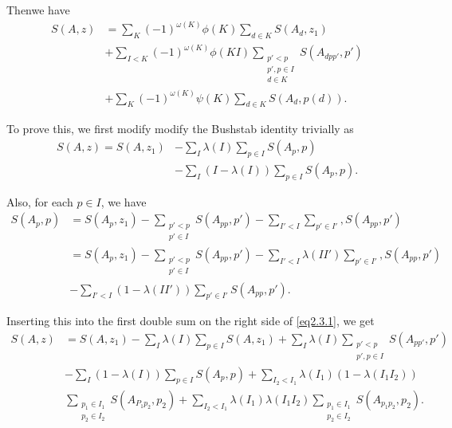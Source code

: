 Then\pageoriginale we have 
\begin{align*}
  S(A,z) & = \sum_K (-1)^{\omega(K)} \phi (K) \sum_{d \in K} S(A_d, z_1) \\
  & + \sum_{I < K} (-1)^{\omega (K)} \phi (KI) \sum_{\substack{ p' <  p
      \\ p', p \in I \\ d \in K}}  S(A_{dpp'}, p') \\  
  & +  \sum_K (-1)^{\omega(K)} \psi (K) \sum_{d \in K} S(A_d, p(d)).
\end{align*}

To prove this, we first modify modify the Bushstab identity trivially as 
\begin{align*}
  S(A,z) = S(A,z_1) & - \sum_I \lambda (I) \sum_{p \in I} S(A_p,  p)
  \\ \tag{2.3.1}
  & - \sum_I (I - \lambda(I)) \sum_{p \in I} S(A_p,  p).  \label{eq2.3.1}
\end{align*}

Also, for each $ p \in I$, we have
\begin{align*}
  S(A_p,  p) & = S(A_p,  z_1)  - \sum_{\substack{ p' <  p \\ p'  \in I
      }} S(A_{pp},p') - \sum_{I' < I} \sum_{p' \in I'}, S(A_{pp},p')\\ 
  &  = S(A_p,  z_1)  - \sum_{\substack{ p' <  p \\ p'  \in I}}
  S(A_{pp},p') - \sum_{I' < I} \lambda (II') \sum_{p' \in I'},
  S(A_{pp},p') \\ 
  & -\sum_{I' < I} (1 - \lambda (II')) \sum_{p' \in I'} S(A_{pp},p'). 
\end{align*}

Inserting this into the first double sum on the right side of
\eqref{eq2.3.1}, we get 
\begin{align*}
  S(A,z) & = S(A, z_1) - \sum_I \lambda(I) \sum_{p \in I}  S(A, z_1) +
  \sum_I \lambda(I) \sum_{\substack{ p' <  p \\ p', p  \in I  }}
  S(A_{pp'}, p') \\ 
  & - \sum_I (1 - \lambda (I)) \sum_{p \in I} S(A_p,  p) + \sum_{I_2 <
    I_1} \lambda(I_1) (1 - \lambda (I_1 I_2)) \\
  & \sum_{\substack{ p_1 \in I_1 \\ p_2 \in   I_2}} S(A_{P_1 p_2}, p_2) 
  + \sum_{I_2 < I_1} \lambda(I_1) \lambda(I_1 I_2) \sum_{\substack{
      p_1 \in   I_1 \\ p_2 \in   I_2}} S(A_{p_1 p_2},p_2). 
\end{align*}\pageoriginale

